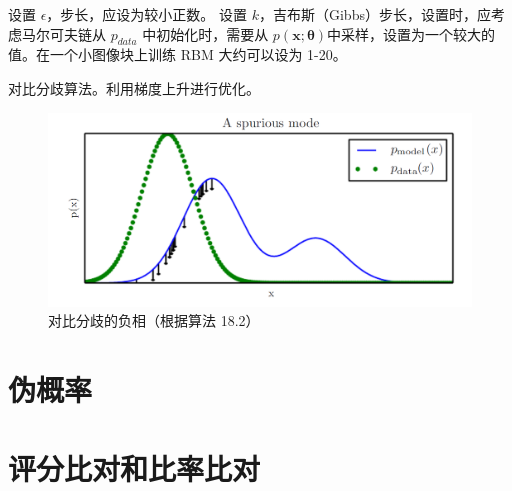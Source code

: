 \begin{algorithm}
\DontPrintSemicolon
设置 \(\epsilon\)，步长，应设为较小正数。\;
设置 \(k\)，吉布斯（Gibbs）步长，设置时，应考虑马尔可夫链从 \(p_{data}\) 中初始化时，需要从 \(p(\bm{x};\bm{\theta})\)中采样，设置为一个较大的值。在一个小图像块上训练 RBM 大约可以设为 1-20。\;
\caption{对比分歧算法。利用梯度上升进行优化。\label{alg:18.2}}
\end{algorithm}

\begin{figure}[htbp] %
   \centering
   \includegraphics[width=\textwidth]{fig/chap18/18_2.png} 
   \caption{对比分歧的负相（根据算法 18.2）}
   \label{fig:18.2}
\end{figure}

\section{伪概率}
\label{sec:18.3}

\section{评分比对和比率比对}
\label{sec:18.4}


